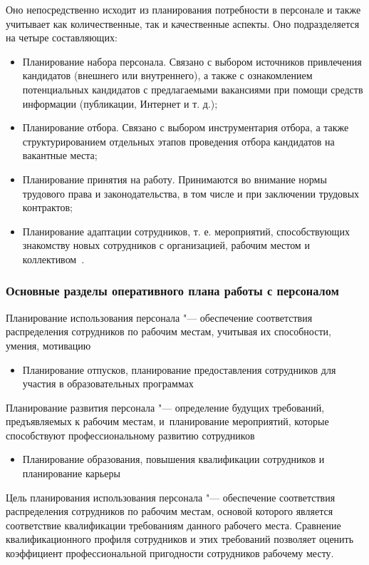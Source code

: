 \documentclass{../industrial-development}
\begin{document}
\lecturenotes

Оно непосредственно исходит из планирования потребности в персонале и также учитывает как количественные, так и качественные аспекты. Оно подразделяется на четыре составляющих:
 \begin{itemize}
\item Планирование набора персонала. Связано с выбором источников привлечения кандидатов (внешнего или внутреннего), а также с ознакомлением потенциальных кандидатов с предлагаемыми вакансиями при помощи средств информации (публикации, Интернет и т. д.);
\item Планирование отбора. Связано с выбором инструментария отбора, а также структурированием отдельных этапов проведения отбора кандидатов на вакантные места;
\item Планирование принятия на работу. Принимаются во внимание нормы трудового права и законодательства, в том числе и при заключении трудовых контрактов;
\item Планирование адаптации сотрудников, т. е. мероприятий, способствующих знакомству новых сотрудников с организацией, рабочим местом и коллективом~\cite{Durakova}.
  \end{itemize}

\begin{frame} \frametitle{Основные разделы оперативного плана работы с персоналом}
\alert{Планирование использования персонала} "--- обеспечение соответствия распределения сотрудников по рабочим местам, учитывая их способности, умения, мотивацию
  \begin{itemize}
	\item {\small Планирование отпусков, планирование предоставления сотрудников для участия в образовательных программах}
		  \end{itemize}	
\alert{Планирование развития персонала} "--- определение будущих требований, предъявляемых к рабочим местам, и~планирование мероприятий, которые способствуют профессиональному развитию сотрудников
	  \begin{itemize}
		\item {\small Планирование образования, повышения квалификации сотрудников и планирование карьеры}
		\end{itemize}
\end{frame}
\lecturenotes

\alert{Цель планирования использования персонала} "--- обеспечение соответствия распределения сотрудников по рабочим местам, основой которого является соответствие квалификации требованиям данного рабочего места. Сравнение квалификационного профиля сотрудников и этих требований позволяет оценить коэффициент профессиональной пригодности сотрудников рабочему месту.
\end{document}
